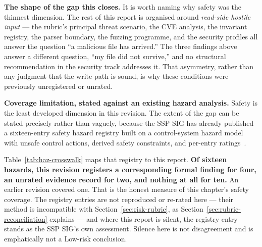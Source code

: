 \documentclass[../main.tex]{subfiles}
\begin{document}
\noindent\textbf{The shape of the gap this closes.}
It is worth naming why safety was the thinnest dimension. The rest of this
report is organised around \emph{read-side hostile input} --- the rubric's
principal threat scenario, the CVE analysis, the invariant registry, the parser
boundary, the fuzzing programme, and the security profiles all answer the
question ``a malicious file has arrived.'' The three findings above answer a
different question, ``my file did not survive,'' and no structural
recommendation in the security track addresses it. That asymmetry, rather than
any judgment that the write path is sound, is why these conditions were
previously unregistered or unrated.

\noindent\textbf{Coverage limitation, stated against an existing hazard
analysis.}
Safety is the least developed dimension in this revision. The
extent of the gap can be stated precisely rather than vaguely, because the SSP
SIG has already published a sixteen-entry safety hazard registry built on a
control-system hazard model with unsafe control actions, derived safety
constraints, and per-entry
ratings~\cite{hdf5-ssp-haz,hdf5-safety-hazard-model}.

Table~\ref{tab:haz-crosswalk} maps that registry to this report.
\textbf{Of sixteen hazards, this revision registers a corresponding formal
finding for four, an unrated evidence record for two, and nothing at all for
ten.} An earlier revision covered one. That is the honest measure of this chapter's safety coverage. The
registry entries are not reproduced or re-rated here --- their method is
incompatible with Section~\ref{sec:risk-rubric}, as
Section~\ref{sec:rubric-reconciliation} explains --- and where this report is
silent, the registry entry stands as the SSP SIG's own assessment. Silence
here is not disagreement and is emphatically not a Low-risk conclusion.
\end{document}
